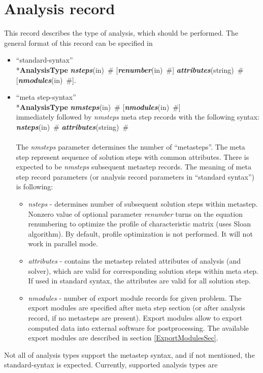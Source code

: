 \documentclass[draft]{article}
\newcommand{\param}[1]{{\em #1}}
\newcommand{\keywordnotype}[1]{\mbox{{\it{\bf{#1}}}}}
\newcommand{\keyword}[2]{\mbox{{\keywordnotype{#1}\tiny (#2)}}}
\newcommand{\entKeyword}[1]{\mbox{{*{\bf{#1}}}}}
\newcommand{\field}[2]{\mbox{\keyword{#1}{#2}~\#}}
\newcommand{\optField}[2]{\mbox{[\field{#1}{#2}]}}
\begin{document}
\section{Analysis record}
\label{_AnalysisRecord}
This record describes the type of analysis, which should be
performed. The general format of this record can be specified in 
\begin{itemize}
\item ``standard-syntax''\\
\entKeyword{AnalysisType} \field{nsteps}{in} \optField{renumber}{in}
\field{attributes}{string} \optField{nmodules}{in}.
\item ``meta step-syntax''\\
\entKeyword{AnalysisType} \field{nmsteps}{in}
\optField{nmodules}{in}\\
immediately followed by \param{nmsteps} meta step records with the following syntax:\\
\field{nsteps}{in} \field{attributes}{string}\\\\
The \param{nmsteps} parameter determines the number of ``metasteps''. The
meta step represent sequence of solution steps with common attributes.
There is expected to be \param{nmsteps} subsequent metastep records.
The meaning of meta step record parameters (or analysis record
parameters in ``standard syntax'') is following:
\begin{itemize}
\item \param{nsteps} - determines number of subsequent solution steps
within me\-ta\-step.
Nonzero value of optional parameter \param{renumber} turns on the
equation renumbering to optimize the profile of characteristic matrix
(uses Sloan algorithm). By default, profile optimization is not
performed. It will not work in parallel mode.
\item \param{attributes} - contains the metastep related attributes of
analysis (and solver), which are valid for corresponding solution
steps within meta step. If used in standard syntax, the attributes are
valid for all solution step.
\item \param{nmodules} - number of export module records for given
problem. The export modules are specified after meta step section (or
after analysis record, if no metasteps are present). Export modules
allow to export computed data into external software for
postprocessing. The available export modules are described in section
\ref{ExportModulesSec}.

\end{itemize}

\end{itemize}
Not all of analysis types support the metastep syntax, and if 
not mentioned, the standard-syntax is expected.
Currently, supported analysis types are
\end{document}
